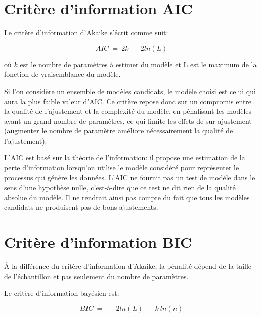 \documentclass[11pt,fleqn]{book} %
\begin{document}
	\newpage
	
	\section{Critère d'information AIC}
	
	\vspace{1em}
	
	Le critère d'information d'Akaike s'écrit comme suit:
	
	\[
	AIC\:=\:2k\:-\:2ln(L)
	\]
	
	où $k$ est le nombre de paramètres à estimer du modèle et L est le maximum de la fonction de vraisemblance du modèle.
	
	\vspace{1em}
	
	Si l'on considère un ensemble de modèles candidats, le modèle choisi est celui qui aura la plus faible valeur d'AIC. Ce critère repose donc sur un compromis entre la qualité de l'ajustement et la complexité du modèle, en pénalisant les modèles ayant un grand nombre de paramètres, ce qui limite les effets de sur-ajustement (augmenter le nombre de paramètre améliore nécessairement la qualité de l'ajustement).
	
	L'AIC est basé sur la théorie de l'information: il propose une estimation de la perte d'information lorsqu'on utilise le modèle considéré pour représenter le processus qui génère les données. L'AIC ne fournit pas un test de modèle dans le sens d'une hypothèse nulle, c'est-à-dire que ce test ne dit rien de la qualité absolue du modèle. Il ne rendrait ainsi pas compte du fait que tous les modèles candidats ne produisent pas de bons ajustements.
	
	\vspace{1em}
	
	\section{Critère d'information BIC}
	
	\vspace{1em}
	
	À la différence du critère d'information d'Akaike, la pénalité dépend de la taille de l'échantillon et pas seulement du nombre de paramètres.
	
	\vspace{1em}
	
	Le critère d'information bayésien est:
	
	\[
	BIC\:=\:-\:2ln(L)\:+\:k\:ln(n)
	\]
	
\end{document}
